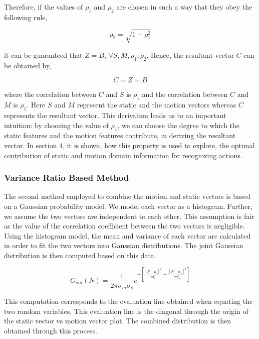 Therefore, if the values of $\rho_{1}$ and $\rho_{2}$ are chosen in such a way that they obey the following
rule,

\begin{equation}
\rho_{2} = \sqrt{1-\rho_{1}^2}
\end{equation}

it can be guaranteed that $Z = B$, $\forall S,M,\rho_{1},\rho_{2}$. Hence, the resultant vector $C$ can be obtained
by,

\begin{equation}
C=Z=B
\end{equation}

where the correlation between $C$ and $S$ is $\rho_{1}$ and the correlation between $C$ and $M$ is $\rho_{1}$. Here $S$ and $M$ represent the static and the
motion vectors whereas $C$ represents the resultant vector. This derivation
leads us to an important intuition: by choosing the value of $\rho_{1}$, we can
choose the degree to which the static features and the motion features contribute,
in deriving the resultant vector. In section 4, it is shown, how this property is used to explore, the optimal contribution of
static and motion domain information for recognizing actions.

\subsubsection{Variance Ratio Based Method}

The second method employed to combine the motion and static vectors is based on a Gaussian probability model. We model each vector as a histogram. Further, we assume the two vectors are independent to each other. This assumption is fair as the value of the correlation coefficient between the two vectors is negligible. Using the histogram model, the mean and variance of each vector are calculated in order to fit the two vectors into Gaussian distributions. The joint Gaussian distribution is then computed based on this data.

\begin{equation}
G_{sm}(N)= \frac{1}{2\pi\sigma_m\sigma_s} e^{-\left[\frac{[N-\mu_s]^2}{2\sigma_s^2}+ \frac{[N-\mu_m]^2}{2\sigma_m^2} \right]}
\end{equation}

This computation corresponds to the evaluation line obtained when equating the two random variables. This evaluation line is the diagonal through the origin of the static vector vs motion vector plot. The combined distribution is then obtained through this process.

